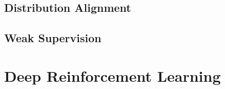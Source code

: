 \documentclass{article}
\begin{document}
  \subsection{Distribution Alignment}

  \subsection{Weak Supervision} 

\section{Deep Reinforcement Learning}




\end{document}
